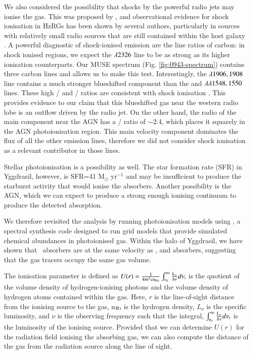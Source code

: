 We also considered the possibility that shocks by the powerful radio jets may ionise the gas. This was proposed by \citet{dopita1995}, and observational evidence for shock ionisation in HzRGs has been shown by several authors, particularly in sources with relatively small radio sources that are still contained within the host galaxy \citep[e.g.][]{allen1998,best2000a,debreuck2000}. A powerful diagnostic of shock-ionised emission are the line ratios of carbon: in shock ionised regions, we expect the \ion{C}{II]} $\lambda2326$ line to be as strong as its higher ionisation counterparts. Our MUSE spectrum (Fig. \ref{fig:0943-spectrum}) contains three carbon lines and allows us to make this test. Interestingly, the \ion{C}{II]} $\lambda1906,1908$ line contains a much stronger blueshifted component than the \ion{C}{III]} and  $\lambda\lambda1548,1550$ lines. These high \ion{C}{II]}/\ion{C}{III]} and \ion{C}{II]}/ ratios are consistent with shock ionisation \citep[see e.g. Fig. 1 of][]{best2000a}. This provides evidence to our claim that this blueshifted gas near the western radio lobe is an outflow driven by the radio jet. On the other hand, the radio of the main component near the AGN has a \ion{C}{III]}/\ion{C}{II]} ratio of $\sim$2.4, which places it squarely in the AGN photoionisation region. This main velocity component dominates the flux of all the other emission lines, therefore we did not consider shock ionisation as a relevant contributor in those lines.

Stellar photoionisation is a possibility as well. The star formation rate (SFR) in Yggdrasil, however, is SFR=41 M$_\odot$ yr$^{-1}$ \citep{falkendal2019} and may be insufficient to produce the starburst activity that would ionise the absorbers. Another possibility is the AGN, which we can expect to produce a strong enough ionising continuum to produce the detected absorption. 

We therefore revisited the analysis by running photoionisation models using  \citep{ferland2017}, a spectral synthesis code designed to run grid models that provide simulated chemical abundances in photoionised gas. Within the halo of Yggdrasil, we have shown that \lya~absorbers are at the same velocity as ,  and  absorbers, suggesting that the gas tracers occupy the same gas volume. 

The ionisation parameter is defined as $U(r) = \frac{ 1 }{ 4 \pi {\rm r}^2 {\rm c} {\rm n}_\ion{H}{I}} \int^\infty_{\nu_0} \frac{ {\rm L}_\nu }{ h\nu }d\nu,$ is the quotient of the volume density of hydrogen-ionising photons and the volume density of hydrogen atoms contained within the gas. Here, $r$ is the line-of-sight distance from the ionising source to the gas, n$_\ion{H}{I}$ is the hydrogen density, $L_\nu$ is the specific luminosity, and $\nu$ is the observing frequency such that the integral, $\int^{\infty}_{\nu_0} \frac{ {\rm L}_\nu }{ h\nu }d\nu,$ is the luminosity of the ionising source. Provided that we can determine $U(r)$ for the radiation field ionising the absorbing gas, we can also compute the distance of the gas from the radiation source  along the line of sight.

